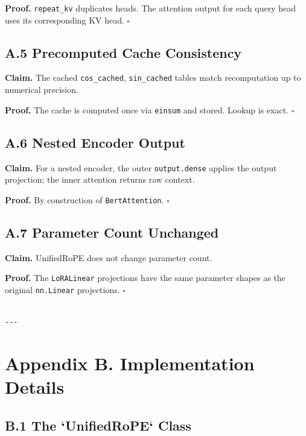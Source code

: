 \textbf{Proof.} \texttt{repeat\_kv} duplicates heads. The attention output for each 
query head uses its corresponding KV head. $\square$

\subsection{A.5 Precomputed Cache Consistency}

\textbf{Claim.} The cached \texttt{cos\_cached}, \texttt{sin\_cached} tables match recomputation 
up to numerical precision.

\textbf{Proof.} The cache is computed once via \texttt{einsum} and stored. Lookup is 
exact. $\square$

\subsection{A.6 Nested Encoder Output}

\textbf{Claim.} For a nested encoder, the outer \texttt{output.dense} applies the 
output projection; the inner attention returns raw context.

\textbf{Proof.} By construction of \texttt{BertAttention}. $\square$

\subsection{A.7 Parameter Count Unchanged}

\textbf{Claim.} UnifiedRoPE does not change parameter count.

\textbf{Proof.} The \texttt{LoRALinear} projections have the same parameter shapes as 
the original \texttt{nn.Linear} projections. $\square$
\begin{lstlisting}

---
\end{lstlisting}


\section{Appendix B. Implementation Details}

\subsection{B.1 The `UnifiedRoPE` Class}

